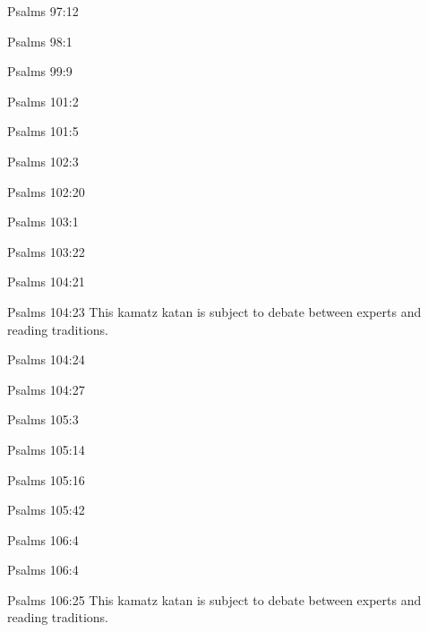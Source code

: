 \documentclass[14pt]{article}
\begin{document}
\begin{itemize}
{{{{{{{{{{\item Psalms 97:12

\item Psalms 98:1

\item Psalms 99:9

\item Psalms 101:2

\item Psalms 101:5

\item Psalms 102:3

\item Psalms 102:20

\item Psalms 103:1

\item Psalms 103:22

\item Psalms 104:21

\item Psalms 104:23 This kamatz katan is subject to debate between experts and reading traditions.

\item Psalms 104:24

\item Psalms 104:27

\item Psalms 105:3

\item Psalms 105:14

\item Psalms 105:16

\item Psalms 105:42

\item Psalms 106:4

\item Psalms 106:4

\item Psalms 106:25 This kamatz katan is subject to debate between experts and reading traditions.

}}}}}}}}}}
\end{itemize}
\end{document}
